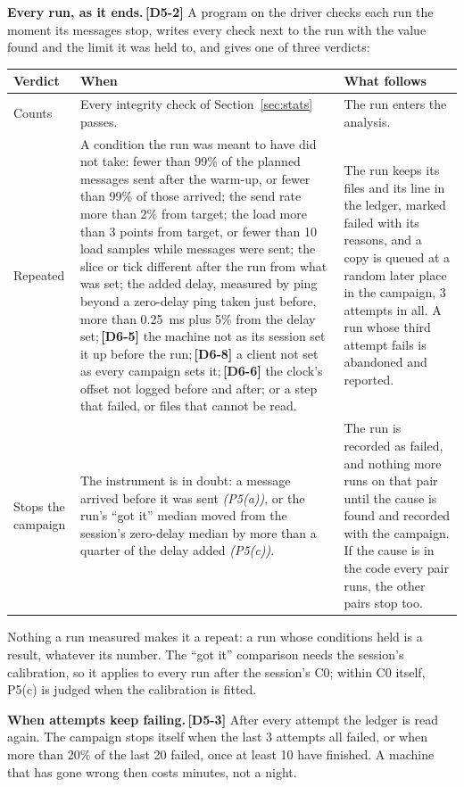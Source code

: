\documentclass[11pt]{article}
\newcommand{\gl}[1]{{\color{soft}\itshape\small (#1)}}
\newcommand{\chg}[1]{\,{\color{chgcol}\bfseries\footnotesize[#1]}}
\newcommand{\chgold}[1]{\,{\color{oldcol}\bfseries\footnotesize[#1]}}
\begin{document}
\textbf{Every run, as it ends.}\chgold{D5-2} A program on the driver checks each run the moment its messages stop, writes every check next to the run with the value found and the limit it was held to, and gives one of three verdicts:
{\small
\begin{longtable}{@{}>{\raggedright\arraybackslash}p{2.1cm} >{\raggedright\arraybackslash}p{8.3cm} >{\raggedright\arraybackslash}p{5.4cm}@{}}
\toprule
\textbf{Verdict} & \textbf{When} & \textbf{What follows} \\
\midrule
\endhead
Counts & Every integrity check of Section~\ref{sec:stats} passes. & The run enters the analysis. \\
Repeated & A condition the run was meant to have did not take: fewer than 99\% of the planned messages sent after the warm-up, or fewer than 99\% of those arrived; the send rate more than 2\% from target; the load more than 3 points from target, or fewer than 10 load samples while messages were sent; the slice or tick different after the run from what was set; the added delay, measured by ping beyond a zero-delay ping taken just before, more than 0.25~ms plus 5\% from the delay set;\chg{D6-5} the machine not as its session set it up before the run;\chg{D6-8} a client not set as every campaign sets it;\chg{D6-6} the clock's offset not logged before and after; or a step that failed, or files that cannot be read. & The run keeps its files and its line in the ledger, marked failed with its reasons, and a copy is queued at a random later place in the campaign, 3 attempts in all. A run whose third attempt fails is abandoned and reported. \\
Stops the campaign & The instrument is in doubt: a message arrived before it was sent \gl{P5(a)}, or the run's ``got it'' median moved from the session's zero-delay median by more than a quarter of the delay added \gl{P5(c)}. & The run is recorded as failed, and nothing more runs on that pair until the cause is found and recorded with the campaign. If the cause is in the code every pair runs, the other pairs stop too. \\
\bottomrule
\end{longtable}}
Nothing a run measured makes it a repeat: a run whose conditions held is a result, whatever its number. The ``got it'' comparison needs the session's calibration, so it applies to every run after the session's C0; within C0 itself, P5(c) is judged when the calibration is fitted.

\textbf{When attempts keep failing.}\chgold{D5-3} After every attempt the ledger is read again. The campaign stops itself when the last 3 attempts all failed, or when more than 20\% of the last 20 failed, once at least 10 have finished. A machine that has gone wrong then costs minutes, not a night.
\end{document}
